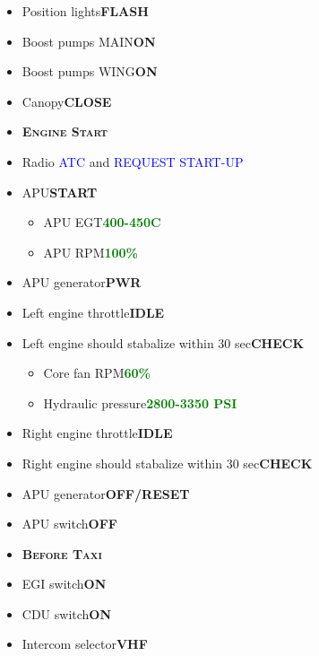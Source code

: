 \documentclass[a4paper,12pt,dvipsnames]{letter}
\newcommand{\radio}[1]{\textcolor{blue}{#1}}
\newcommand{\button}[1]{\textbf{#1}}
\newcommand{\degC}{\textdegree{}C}
\newcommand{\ok}[1]{\textcolor{Green}{\textbf{#1}}}
\newcommand{\myHead}[1]{{\LARGE\textsc{\textbf{#1}}}}
\begin{document}
{\begin{itemize}
 \item Position lights\dotfill\button{FLASH}
 \item Boost pumps MAIN\dotfill\button{ON}
 \item Boost pumps WING\dotfill\button{ON}
 \item Canopy\dotfill\button{CLOSE}
\end{itemize}
\newpage
\begin{itemize}
 \item[] \myHead{Engine Start}
 \item Radio \radio{ATC} and \radio{REQUEST START-UP}
 \item APU\dotfill\button{START}
  \begin{itemize}
  \item APU EGT\dotfill\ok{400-450\degC}
  \item APU RPM\dotfill\ok{100\;\%}
 \end{itemize}
 \item APU generator\dotfill\button{PWR}
 \item Left engine throttle\dotfill\button{IDLE}
 \item Left engine should stabalize within 30 sec\dotfill\button{CHECK}
  \begin{itemize}
  \item Core fan RPM\dotfill\ok{60\;\%}
  \item Hydraulic pressure\dotfill\ok{2800-3350 PSI}
 \end{itemize}
 \item Right engine throttle\dotfill\button{IDLE}
 \item Right engine should stabalize within 30 sec\dotfill\button{CHECK}
 \item APU generator\dotfill\button{OFF/RESET}
 \item APU switch\dotfill\button{OFF}
\end{itemize}
\vspace{0.5em}
\begin{itemize}
 \item[] \myHead{Before Taxi}
 \item EGI switch\dotfill\button{ON}
 \item CDU switch\dotfill\button{ON}
 \item Intercom selector\dotfill\button{VHF}

\end{itemize}}
\end{document}
